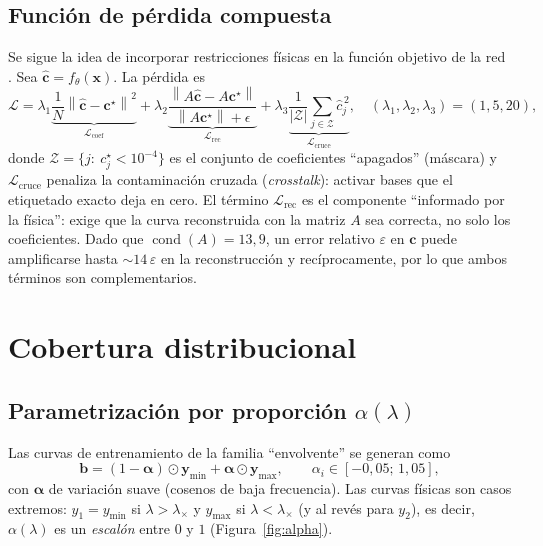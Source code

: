 \documentclass[11pt,twoside]{article}
\theoremstyle{definition}
\theoremstyle{remark}
\newcommand{\norm}[1]{\left\lVert #1\right\rVert}
\DeclareMathOperator{\cond}{cond}
\begin{document}
\subsection{Función de pérdida compuesta}
Se sigue la idea de incorporar restricciones físicas en la función objetivo de la red \cite{Raissi2019}.
Sea $\hat{\bm c}=f_\theta(\bm x)$. La pérdida es
\begin{equation}
 \mathcal L=\lambda_1\underbrace{\frac1N\norm{\hat{\bm c}-\bm c^\star}^2}_{\mathcal L_{\mathrm{coef}}}
 +\lambda_2\underbrace{\frac{\norm{A\hat{\bm c}-A\bm c^\star}}{\norm{A\bm c^\star}+\epsilon}}_{\mathcal L_{\mathrm{rec}}}
 +\lambda_3\underbrace{\frac1{|\mathcal Z|}\sum_{j\in\mathcal Z}\hat c_j^{\,2}}_{\mathcal L_{\mathrm{cruce}}},
 \quad(\lambda_1,\lambda_2,\lambda_3)=(1,5,20),
\end{equation}
donde $\mathcal Z=\{j:\ c_j^\star<10^{-4}\}$ es el conjunto de coeficientes ``apagados'' (máscara) y $\mathcal L_{\mathrm{cruce}}$ penaliza la contaminación cruzada (\emph{crosstalk}): activar bases que el etiquetado exacto deja en cero. El término $\mathcal L_{\mathrm{rec}}$ es el componente ``informado por la física'': exige que la curva reconstruida con la matriz $A$ sea correcta, no solo los coeficientes. Dado que $\cond(A)=13{,}9$, un error relativo $\varepsilon$ en $\bm c$ puede amplificarse hasta $\sim 14\,\varepsilon$ en la reconstrucción y recíprocamente, por lo que ambos términos son complementarios.

\section{Cobertura distribucional}\label{sec:cobertura}
\subsection{Parametrización por proporción $\alpha(\lambda)$}
Las curvas de entrenamiento de la familia ``envolvente'' se generan como
\begin{equation}
 \bm b=(1-\bm\alpha)\odot\bm y_{\min}+\bm\alpha\odot\bm y_{\max},\qquad \alpha_i\in[-0{,}05;\,1{,}05],
\end{equation}
con $\bm\alpha$ de variación suave (cosenos de baja frecuencia). Las curvas físicas son casos extremos: $y_1=y_{\min}$ si $\lambda>\lambda_\times$ y $y_{\max}$ si $\lambda<\lambda_\times$ (y al revés para $y_2$), es decir, $\alpha(\lambda)$ es un \emph{escalón} entre $0$ y $1$ (Figura~\ref{fig:alpha}).
\end{document}
